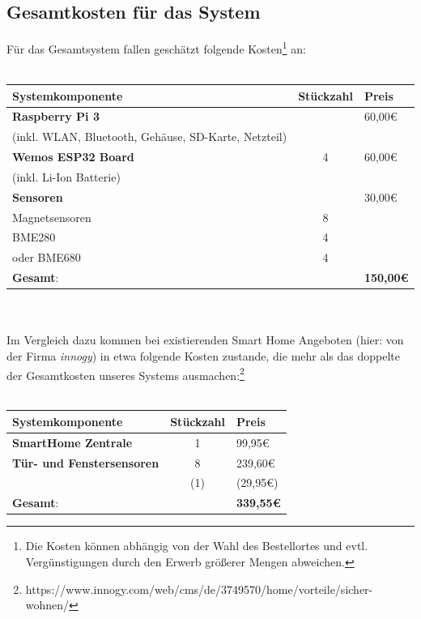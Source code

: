 \documentclass[a4paper,10pt,twocolumn]{article}
\begin{document}
\subsection{Gesamtkosten für das System}
Für das Gesamtsystem fallen geschätzt folgende Kosten\footnote{Die Kosten können abhängig von der Wahl des Bestellortes und evtl. Vergünstigungen durch den Erwerb größerer Mengen abweichen.} an:\\\\
\begin{tabularx}{\columnwidth}{p{5cm}|c|X}
\textbf{Systemkomponente} & \textbf{Stückzahl} & \textbf{Preis} \vspace{1mm}\\
\hline\hline
\textbf{Raspberry Pi 3} & & 60,00\euro{}\\
(inkl. WLAN, Bluetooth, Gehäuse, SD-Karte, Netzteil) & & \vspace{1mm}\\
\hline
\textbf{Wemos ESP32 Board} & 4 & 60,00\euro{}\\
(inkl. Li-Ion Batterie) & & \\
\hline
\textbf{Sensoren} & & 30,00\euro{}\\
Magnetsensoren & 8 &\\
BME280 & 4 & \\
oder BME680 & 4 & \\
\hline\hline
\textbf{Gesamt}: & & \textbf{150,00\euro{}}
\end{tabularx}
\\\\
Im Vergleich dazu kommen bei existierenden Smart Home Angeboten (hier: von der Firma \textit{innogy}) in etwa folgende Kosten zustande, die mehr als das doppelte der Gesamtkosten unseres Systems ausmachen:\footnote{https://www.innogy.com/web/cms/de/3749570/home/vorteile/sicher-wohnen/}\\\\
\begin{tabularx}{\columnwidth}{p{5cm}|c|X}
\textbf{Systemkomponente} & \textbf{Stückzahl} & \textbf{Preis}\vspace{1mm}\\
\hline\hline
\textbf{SmartHome Zentrale} & 1 & 99,95\euro{}\\
\hline
\textbf{Tür- und Fenstersensoren} & 8 & 239,60\euro{}\\
& (1) & (29,95\euro{})\\
\hline\hline
\textbf{Gesamt}: &  & \textbf{339,55\euro{}}
\end{tabularx}
\end{document}
